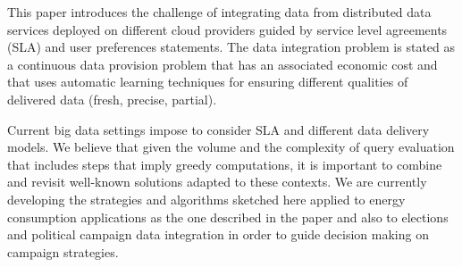 This paper introduces the challenge of integrating data from distributed data services deployed on different cloud providers guided by service level agreements (SLA) and user preferences statements. The data integration problem is stated as a continuous data provision problem that has an associated economic cost and that uses automatic learning techniques for ensuring different qualities of delivered data (fresh, precise, partial).

Current big data settings impose  to consider SLA and different data delivery models. We believe that given the volume and the complexity of query evaluation that includes steps that imply greedy computations, it is important to combine and revisit well-known solutions  adapted to these contexts. We are currently developing the strategies and algorithms sketched here applied to energy consumption applications as the one described in the paper and also to elections and political campaign data integration in order to guide decision making on campaign strategies.
